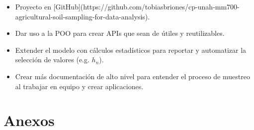 \documentclass{article}
\begin{document}
\begin{itemize}
    \item Proyecto en [GitHub](https://github.com/tobiasbriones/cp-unah-mm700-agricultural-soil-sampling-for-data-analysis).
    
    \item Dar uso a la POO para crear APIs que sean de útiles y reutilizables.
    
    \item Extender el modelo con cálculos estadísticos para reportar y automatizar la selección de valores (e.g. $h_n$).
    
    \item Crear más documentación de alto nivel para entender el proceso de muestreo al trabajar en equipo y crear aplicaciones.
\end{itemize}


\section{Anexos}



\printbibliography
\end{document}
